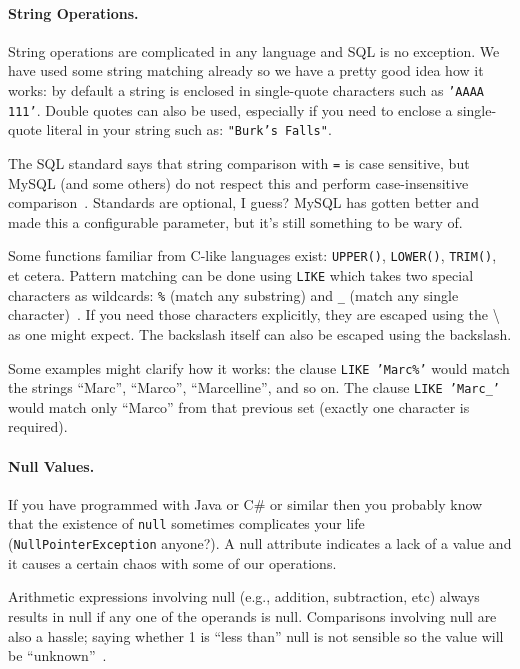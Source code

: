 \documentclass[a4paper]{report}
\begin{document}
\paragraph{String Operations.} String operations are complicated in any language and SQL is no exception. We have used some string matching already so we have a pretty good idea how it works: by default a string is enclosed in single-quote characters such as \texttt{'AAAA 111'}. Double quotes can also be used, especially if you need to enclose a single-quote literal in your string such as: \texttt{"Burk's Falls"}.

The SQL standard says that string comparison with \texttt{=} is case sensitive, but MySQL (and some others) do not respect this and perform case-insensitive comparison~\cite{dsc}. Standards are optional, I guess? MySQL has gotten better and made this a configurable parameter, but it's still something to be wary of.

Some functions familiar from C-like languages exist: \texttt{UPPER()}, \texttt{LOWER()}, \texttt{TRIM()}, et cetera. Pattern matching can be done using \texttt{LIKE} which takes two special characters as wildcards: \texttt{\%} (match any substring) and \texttt{\_} (match any single character)~\cite{dsc}.  If you need those characters explicitly, they are escaped using the \textbackslash~ as one might expect. The backslash itself can also be escaped using the backslash.

Some examples might clarify how it works: the clause \texttt{LIKE 'Marc\%'} would match the strings ``Marc'', ``Marco'', ``Marcelline'', and so on. The clause \texttt{LIKE 'Marc\_'} would match only ``Marco'' from that previous set (exactly one character is required). 


\paragraph{Null Values.} If you have programmed with Java or C\# or similar then you probably know that the existence of \texttt{null} sometimes complicates your life (\texttt{NullPointerException} anyone?). A null attribute indicates a lack of a value and it causes a certain chaos with some of our operations.

Arithmetic expressions involving null (e.g., addition, subtraction, etc) always results in null if any one of the operands is null. Comparisons involving null are also a hassle; saying whether 1 is ``less than'' null is not sensible so the value will be ``unknown''~\cite{dsc}.
\end{document}
